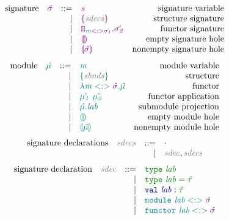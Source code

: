 \documentclass[12pt,fleqn]{article}
\newcommand{\green}[1]{\textcolor{green}{#1}}
\newcommand{\blue}[1]{\textcolor{blue}{#1}}
\newcommand{\purple}[1]{\textcolor{purple}{#1}}
\newcommand{\teal}[1]{\textcolor{teal}{#1}}
\newcommand{\grey}[1]{\textcolor{grey}{#1}}
\newcommand{\greentt}[1]{\green{\mathtt{#1}}}
\newcommand{\bluett}[1]{\blue{\mathtt{#1}}}
\newcommand{\purplett}[1]{\purple{\mathtt{#1}}}
\newcommand{\tealtt}[1]{\teal{\mathtt{#1}}}
\newcommand{\greenit}[1]{\green{\mathit{#1}}}
\newcommand{\purpleit}[1]{\purple{\mathit{#1}}}
\newcommand{\tealit}[1]{\teal{\mathit{#1}}}
\newcommand{\greyit}[1]{\grey{\mathit{#1}}}
\newcommand{\typ}[1][]{\greenit{\hat{\tau#1}}}
\newcommand{\sig}[1][]{\purpleit{\hat{\sigma#1}}}
\newcommand{\sigvar}[1][]{\purpleit{s#1}}
\renewcommand{\mod}[1][]{\tealit{\hat{\mu#1}}}
\newcommand{\modvar}[1][]{\tealit{m#1}}
\newcommand{\lab}[1][]{\mathit{lab#1}}
\newcommand{\Sig}[1]{\purplett{\{#1\}}}
\newcommand{\FunctorSig}[2]{\purplett{\Pi_{#1}.{#2}}}
\newcommand{\SigHole}[1][]{\purplett{\llparenthesis#1\rrparenthesis}}
\newcommand{\Struct}[1]{\tealtt{\{#1\}}}
\newcommand{\Functor}[2]{\tealtt{\lambda #1.#2}}
\newcommand{\FunctorAp}[2]{\tealtt{#1~#2}}
\newcommand{\SubModulePrj}[2]{\tealtt{#1.#2}}
\newcommand{\ModHole}[1][]{\tealtt{\llparenthesis#1\rrparenthesis}}
\newcommand{\sbnds}{\greyit{sbnds}}
\newcommand{\sdec}{\greyit{sdec}}
\newcommand{\sdecs}{\greyit{sdecs}}
\begin{document}
\[\begin{array}{rcrlr}
    \textrm{signature} & \sig & ::=
                       & \sigvar & \textrm{signature variable} \\
                       && \vert & \Sig{\sdecs} & \textrm{structure signature} \\
                       && \vert & \FunctorSig{\modvar <:> \sig[_1]}{\sig[_2]} & \textrm{functor signature} \\
                       && \vert & \SigHole & \textrm{empty signature hole} \\
                       && \vert & \SigHole[\sig] & \textrm{nonempty signature hole} \\
\end{array}\]
\[\begin{array}{rcrlr}
    \textrm{module} & \mod & ::=
                    & \modvar & \textrm{module variable} \\
                    && \vert & \Struct{\sbnds} & \textrm{structure} \\
                    && \vert & \Functor{\modvar <:> \sig}{\mod} & \textrm{functor} \\
                    && \vert & \FunctorAp{\mod[_1]}{\mod[_2]} & \textrm{functor application} \\
                    && \vert & \SubModulePrj{\mod}{\lab} & \textrm{submodule projection} \\
                    && \vert & \ModHole & \textrm{empty module hole} \\
                    && \vert & \ModHole[\mod] & \textrm{nonempty module hole} \\
\end{array}\]
\[\begin{array}{rcrlr}
    \textrm{signature declarations} & \sdecs & ::=
                                & \cdot \\
                                && \vert & \sdec, \sdecs\\
\end{array}\]
\[\begin{array}{rcrlr}
    \textrm{signature declaration} & \sdec & ::=
                                   & \greentt{type~\lab} \\
                                   && \vert & \greentt{type~\lab = \typ} \\
                                   && \vert & \bluett{val~\lab : \typ} \\
                                   && \vert & \tealtt{module~\lab <:> \sig} \\
                                   && \vert & \tealtt{functor~\lab <:> \sig} \\
\end{array}\]
\end{document}
